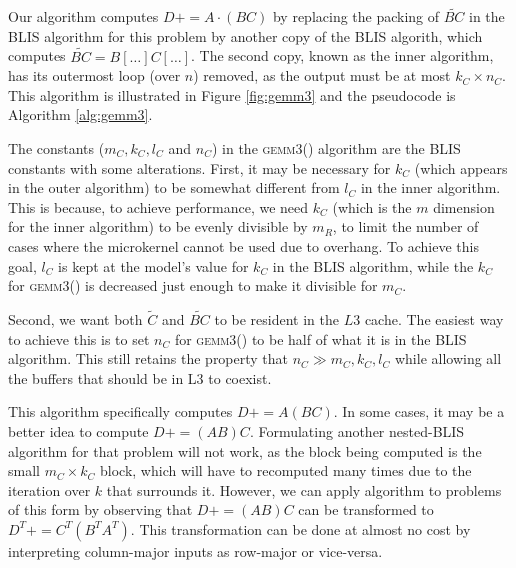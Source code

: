 \documentclass[12pt]{article}
\newcommand*{\TO}{\textbf{to}}
\newcommand*{\pluseq}{\mathrel{{+}{=}}}
\newcommand*{\gemmt}{{\textsc{gemm3()}}}
\begin{document}
\begin{algorithm}
  \caption{Algorithm for \gemmt{}}
  \label{alg:gemm3}
  \begin{algorithmic}
    \For{$j \gets 0, n_C, \ldots$ \TO{} $n$}
    \For{$p \gets 0, k_C, \ldots$ \TO{} $k$}
    \For{$q \gets 0, l_C, \ldots$ \TO{} $l$}
    \For{$i \gets 0, m_C, \ldots$ \TO{} $k_C$}
    \EndFor{}
    \EndFor{}
    \For{$i \gets 0, m_C, \ldots$ \TO{} $m$}
    \EndFor{}
    \EndFor{}
    \EndFor{}
    \EndProcedure{}
  \end{algorithmic}
\end{algorithm}

Our algorithm computes $D \pluseq A \cdot (BC)$ by replacing the packing of $\tilde{BC}$ in the BLIS algorithm for this problem by another copy of the BLIS algorith, which computes $\tilde{BC} = B[\ldots]C[\ldots]$.
The second copy, known as the inner algorithm, has its outermost loop (over $n$) removed, as the output must be at most $k_C \times n_C$.
This algorithm is illustrated in Figure \ref{fig:gemm3} and the pseudocode is Algorithm \ref{alg:gemm3}.

The constants ($m_C, k_C, l_C$ and $n_C$) in the \gemmt{} algorithm are the BLIS constants with some alterations.
First, it may be necessary for $k_C$ (which appears in the outer algorithm) to be somewhat different from $l_C$ in the inner algorithm.
This is because, to achieve performance, we need $k_C$ (which is the $m$ dimension for the inner algorithm) to be evenly divisible by $m_R$, to limit the number of cases where the microkernel cannot be used due to overhang.
To achieve this goal, $l_C$ is kept at the model's value for $k_C$ in the BLIS algorithm, while the $k_C$ for \gemmt{} is decreased just enough to make it divisible for $m_C$.

Second, we want both $\tilde{C}$ and $\tilde{BC}$ to be resident in the $L3$ cache.
The easiest way to achieve this is to set $n_C$ for \gemmt{} to be half of what it is in the BLIS algorithm.
This still retains the property that $n_C \gg m_C, k_C, l_C$ while allowing all the buffers that should be in L3 to coexist.

This algorithm specifically computes $D \pluseq A(BC)$.
In some cases, it may be a better idea to compute $D \pluseq (AB)C$.
Formulating another nested-BLIS algorithm for that problem will not work, as the block being computed is the small $m_C \times k_C$ block, which will have to recomputed many times due to the iteration over $k$ that surrounds it.
However, we can apply algorithm to problems of this form by observing that $D \pluseq (AB)C$ can be transformed to $D^T \pluseq C^T(B^TA^T)$.
This transformation can be done at almost no cost by interpreting column-major inputs as row-major or vice-versa.
\end{document}
